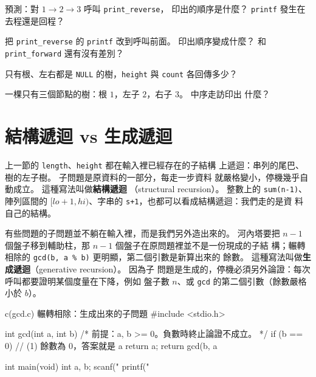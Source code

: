 
\begin{drills}[label=drills:rec-list]
\item 預測：對 $1 \rightarrow 2 \rightarrow 3$ 呼叫 \texttt{print\_reverse}，
印出的順序是什麼？ \texttt{printf} 發生在去程還是回程？
\item 把 \texttt{print\_reverse} 的 \texttt{printf} 改到呼叫前面。
印出順序變成什麼？ 和 \texttt{print\_forward} 還有沒有差別？
\item 只有根、左右都是 \texttt{NULL} 的樹，\texttt{height} 與
\texttt{count} 各回傳多少？
\item 一棵只有三個節點的樹：根 $1$，左子 $2$，右子 $3$。 中序走訪印出
什麼？
\end{drills}

\section{結構遞迴 vs 生成遞迴}
\label{sec:rec-struct-vs-gen}

上一節的 \texttt{length}、\texttt{height} 都在輸入裡已經存在的子結構
上遞迴：串列的尾巴、樹的左子樹。 子問題是原資料的一部分，每走一步資料
就嚴格變小，停機幾乎自動成立。 這種寫法叫做\textbf{結構遞迴}
（structural recursion）。 整數上的 \texttt{sum(n-1)}、陣列區間的
$[lo+1, hi)$、字串的 \texttt{s+1}，也都可以看成結構遞迴：我們走的是資
料自己的結構。

有些問題的子問題並不躺在輸入裡，而是我們另外造出來的。 河內塔要把
$n-1$ 個盤子移到輔助柱，那 $n-1$ 個盤子在原問題裡並不是一份現成的子結
構；輾轉相除的 \texttt{gcd(b, a \% b)} 更明顯，第二個引數是新算出來的
餘數。 這種寫法叫做\textbf{生成遞迴}（generative recursion）。 因為子
問題是生成的，停機必須另外論證：每次呼叫都要證明某個度量在下降，例如
盤子數 $n$、或 \texttt{gcd} 的第二個引數（餘數嚴格小於 $b$）。

\begin{example}{c}{(gcd.c) 輾轉相除：生成出來的子問題}
#include <stdio.h>

int gcd(int a, int b) {
    /* 前提：a, b >= 0。負數時終止論證不成立。 */
    if (b == 0) {              // (1) 餘數為 0，答案就是 a
        return a;
    }
    return gcd(b, a %
}

int main(void) {
    int a, b;
    scanf("%
    printf("%
}
\end{example}

